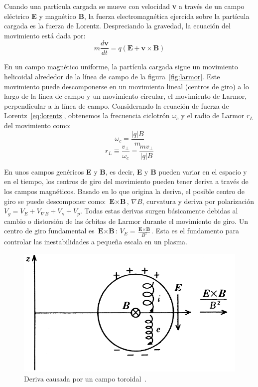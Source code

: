 Cuando una partícula cargada se mueve con velocidad \textbf{v} a través de un campo eléctrico \textbf{E} y magnético 
\textbf{B}, la fuerza electromagnética ejercida sobre la partícula cargada es la fuerza de Lorentz. Despreciando 
la gravedad, la ecuación del movimiento está dada por:
\begin{equation}\label{eq:lorentz}
    m\frac{d\textbf{v}}{dt}=q(\textbf{E}+\textbf{v}\times \textbf{B})
\end{equation}
\par
En un campo magnético uniforme, la partícula cargada sigue un movimiento helicoidal alrededor de la
línea de campo de la figura~\ref{fig:larmor}. Este movimiento puede descomponerse en un movimiento lineal (centros de giro)
a lo largo de la línea de campo y un movimiento circular, el movimiento de Larmor, perpendicular a la línea de campo.
Considerando la ecuación de fuerza de Lorentz~\eqref{eq:lorentz}, obtenemos la frecuencia ciclotrón $\omega_c$ y 
el radio de Larmor $r_L$ del movimiento como:
\begin{equation}\label{eq:ciclotron}
    \omega_c=\frac{\lvert q\rvert B}{m}
\end{equation}
\begin{equation}\label{eq:radiolarmor}
    r_L\equiv\frac{v_\perp}{\omega_c}=\frac{mv_\perp}{\lvert q\rvert B}
\end{equation}
\par
En unos campos genéricos \textbf{E} y \textbf{B}, es decir, \textbf{E} y \textbf{B} pueden variar en el espacio y en el 
tiempo, los centros de giro del movimiento pueden tener deriva a través de los campos magnéticos. Basado en lo que origina 
la deriva, el posible centro de giro se puede descomponer como: $\textbf{E}\times\textbf{B}$, $\nabla B$, curvatura 
y deriva por polarización $V_g=V_E+V_{\nabla B}+V_\kappa+V_p$. Todas estas derivas surgen básicamente debidas al 
cambio o distorsión de las órbitas de Larmor durante el movimiento de giro. Un centro de giro fundamental 
es $\textbf{E}\times\textbf{B}$: $V_E=\frac{\textbf{E}\times\textbf{B}}{B^2}$. 
Esta es el fundamento para controlar las inestabilidades a pequeña escala en un plasma.
\begin{figure}
    \centering
    \includegraphics[scale=0.5]{img/drift.png}
    \caption[Deriva causada por un campo toroidal]{Deriva causada por un campo toroidal~\cite{Miyamoto2011}.}
    \label{fig:drift}
\end{figure}
